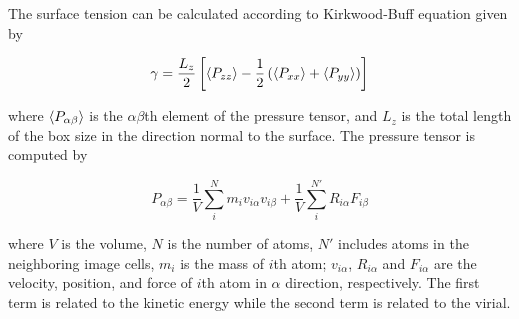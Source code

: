 \begin{itemize}
          The surface tension can be
          calculated according to Kirkwood-Buff
          equation
          \cite{kirkwood1949} given by

          \begin{equation}
              \gamma = \frac{L_z}{2} \left[ \expval{P_{zz}} -\frac{1}{2} \left(
                  \expval{P_{xx}} + \expval{P_{yy}} \right) \right]
              \label{eq:surf_tens}
          \end{equation}

          where $\expval{P_{\alpha \beta}}$ is the $\alpha \beta$th element of the pressure tensor,
          and $L_z$ is the total length of the box size in the direction normal
          to the
          surface. The pressure tensor is computed by \cite{thompson2009general}

          \begin{equation}
              P_{\alpha \beta} = \frac{1}{V}  \sum_i^N m_i v_{i\alpha} v_{i\beta} + \frac{1}{V}  \sum_i^{N'} R_{i\alpha} F_{i\beta}
          \end{equation}

          where $V$ is the volume, $N$ is the number of atoms, $N'$ includes atoms in the neighboring image cells, $m_i$ is the mass of $i$th atom; $v_{i\alpha}$, $R_{i\alpha}$ and $F_{i\alpha}$  are the velocity, position, and force of $i$th atom in $\alpha$ direction, respectively. The first term is related to the kinetic energy while the second term is related to the virial.


\end{itemize}
